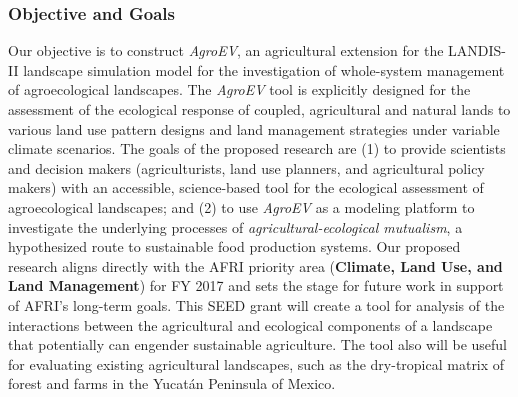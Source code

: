 \documentclass[12pt, letterpaper]{article}
\begin{document}
\subsubsection*{Objective and Goals}
Our objective is to construct \textit{AgroEV}, an agricultural extension for the LANDIS-II landscape simulation model for the investigation of whole-system management of agroecological landscapes. The \textit{AgroEV} tool is explicitly designed for the assessment of the ecological response of coupled, agricultural and natural lands to various land use pattern designs and land management strategies under variable climate scenarios. The goals of the proposed research are (1) to provide scientists and decision makers (agriculturists, land use planners, and agricultural policy makers) with an accessible, science-based tool for the ecological assessment of agroecological landscapes; and (2) to use \textit{AgroEV} as a modeling platform to investigate the underlying processes of \textit{agricultural-ecological mutualism}, a hypothesized route to sustainable food production systems. Our proposed research aligns directly with the AFRI priority area (\textbf{Climate, Land Use, and Land Management}) for FY 2017 and sets the stage for future work in support of AFRI's long-term goals. This SEED grant will create a tool for analysis of the interactions between the agricultural and ecological components of a landscape that potentially can engender sustainable agriculture. The tool also will be useful for evaluating existing agricultural landscapes, such as the dry-tropical matrix of forest and farms in the Yucat\'{a}n Peninsula of Mexico.
\end{document}
